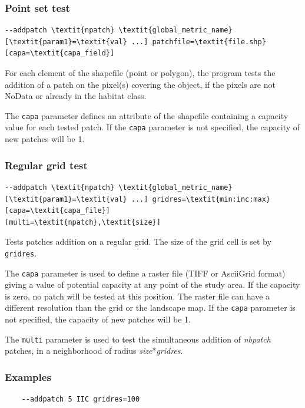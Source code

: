 \documentclass[a4paper,10pt]{report}
\begin{document}
\subsubsection{Point set test}
\begin{Verbatim}[commandchars=\\\{\}]
--addpatch \textit{npatch} \textit{global_metric_name} [\textit{param1}=\textit{val} ...] patchfile=\textit{file.shp} [capa=\textit{capa_field}]
\end{Verbatim}

For each element of the shapefile (point or polygon), the program tests the addition of a patch on the pixel(s) covering the object, if the pixels are not NoData or already in the habitat class.

The \verb|capa| parameter defines an attribute of the shapefile containing a capacity value for each tested patch.
If the \verb|capa| parameter is not specified, the capacity of new patches will be 1.


\subsubsection{Regular grid test}
\begin{Verbatim}[commandchars=\\\{\}]
--addpatch \textit{npatch} \textit{global_metric_name} [\textit{param1}=\textit{val} ...] gridres=\textit{min:inc:max} [capa=\textit{capa_file}]
[multi=\textit{npatch},\textit{size}]
\end{Verbatim}
Tests patches addition on a regular grid. The size of the grid cell is set by \verb|gridres|.

The \verb|capa| parameter is used to define a raster file (TIFF or AsciiGrid format) giving a value of potential capacity at any point of the study area.
If the capacity is zero, no patch will be tested at this position. The raster file can have a different resolution than the grid or the landscape map.
If the \verb|capa| parameter is not specified, the capacity of new patches will be 1.

The \verb|multi| parameter is used to test the simultaneous addition of \textit{nbpatch} patches, in a neighborhood of radius \textit{size}*\textit{gridres}.

\subsubsection{Examples}

\begin{Verbatim}
	--addpatch 5 IIC gridres=100
\end{Verbatim}
\end{document}
